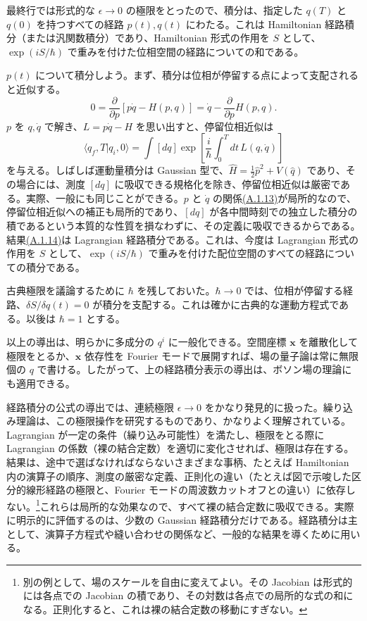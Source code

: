 最終行では形式的な $\epsilon\to0$ の極限をとったので、積分は、指定した $q(T)$ と $q(0)$ を持つすべての経路 $p(t),q(t)$ にわたる。これは Hamiltonian 経路積分（または汎関数積分）であり、Hamiltonian 形式の作用を $S$ として、$\exp(iS/\hbar)$ で重みを付けた位相空間の経路についての和である。

$p(t)$ について積分しよう。まず、積分は位相が停留する点によって支配されると近似する。
\begin{equation}
0=\frac{\partial}{\partial p}[p\dot q-H(p,q)]
=\dot q-\frac{\partial}{\partial p}H(p,q).
\tag{A.1.13}\label{eq:A.1.13}
\end{equation}
$p$ を $q,\dot q$ で解き、$L=p\dot q-H$ を思い出すと、停留位相近似は
\begin{equation}
\langle q_f,T|q_i,0\rangle
=\int[dq]\exp\left[\frac i\hbar\int_0^Tdt\,L(q,\dot q)\right]
\tag{A.1.14}\label{eq:A.1.14}
\end{equation}
を与える。しばしば運動量積分は Gaussian 型で、$\hat H=\tfrac12\hat p^2+V(\hat q)$ であり、その場合には、測度 $[dq]$ に吸収できる規格化を除き、停留位相近似は厳密である。実際、一般にも同じことができる。$p$ と $\dot q$ の関係\hyperref[eq:A.1.13]{(A.1.13)}が局所的なので、停留位相近似への補正も局所的であり、$[dq]$ が各中間時刻での独立した積分の積であるという本質的な性質を損なわずに、その定義に吸収できるからである。結果\hyperref[eq:A.1.14]{(A.1.14)}は Lagrangian 経路積分である。これは、今度は Lagrangian 形式の作用を $S$ として、$\exp(iS/\hbar)$ で重みを付けた配位空間のすべての経路についての積分である。

古典極限を議論するために $\hbar$ を残しておいた。$\hbar\to0$ では、位相が停留する経路、$\delta S/\delta q(t)=0$ が積分を支配する。これは確かに古典的な運動方程式である。以後は $\hbar=1$ とする。

以上の導出は、明らかに多成分の $q^i$ に一般化できる。空間座標 $\mathbf x$ を離散化して極限をとるか、$\mathbf x$ 依存性を Fourier モードで展開すれば、場の量子論は常に無限個の $q$ で書ける。したがって、上の経路積分表示の導出は、ボソン場の理論にも適用できる。

経路積分の公式の導出では、連続極限 $\epsilon\to0$ をかなり発見的に扱った。繰り込み理論は、この極限操作を研究するものであり、かなりよく理解されている。Lagrangian が一定の条件（繰り込み可能性）を満たし、極限をとる際に Lagrangian の係数（裸の結合定数）を適切に変化させれば、極限は存在する。結果は、途中で選ばなければならないさまざまな事柄、たとえば Hamiltonian 内の演算子の順序、測度の厳密な定義、正則化の違い（たとえば図で示唆した区分的線形経路の極限と、Fourier モードの周波数カットオフとの違い）に依存しない。\footnote[1]{別の例として、場のスケールを自由に変えてよい。その Jacobian は形式的には各点での Jacobian の積であり、その対数は各点での局所的な式の和になる。正則化すると、これは裸の結合定数の移動にすぎない。}これらは局所的な効果なので、すべて裸の結合定数に吸収できる。実際に明示的に評価するのは、少数の Gaussian 経路積分だけである。経路積分は主として、演算子方程式や縫い合わせの関係など、一般的な結果を導くために用いる。

